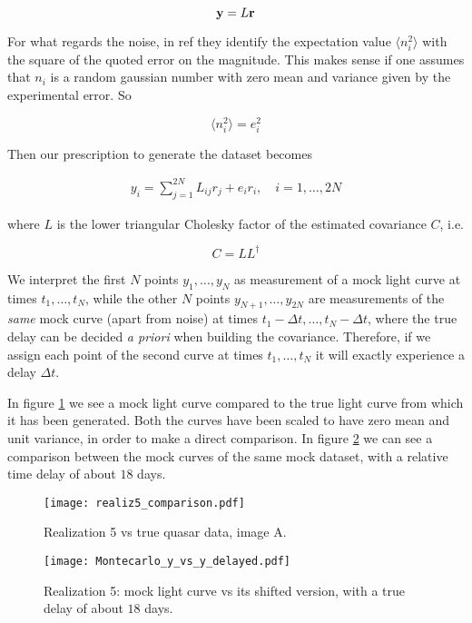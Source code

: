 \begin{equation}
\mathbf{y} = L \mathbf{r}
\end{equation}

For what regards the noise, in ref \cite{Press1992} they identify the expectation value $\langle n_i^2 \rangle$ with the square of the quoted error on the magnitude. This makes sense if one assumes that $n_i$ is a random gaussian number with zero mean and variance given by the experimental error. So

\begin{equation}
\langle n_i^2 \rangle = e_i^2
\end{equation}

Then our prescription to generate the dataset becomes

\begin{align}\label{eq:reform-artificial-prescr}
y_i = \sum_{j=1}^{2N} L_{ij} r_j + e_i r_i, \quad i = 1, \dots , 2N
\end{align}

where $L$ is the lower triangular Cholesky factor of the estimated covariance $C$, i.e.

\[
C = L L^{\dagger}
\]

We interpret the first $N$ points $y_1, \dots, y_N$ as measurement of a mock light curve at times $t_1, \dots , t_N$, 
while the other $N$ points $y_{N+1}, \dots, y_{2N}$ are measurements of the \emph{same} mock curve (apart from noise) at times 
$t_1-\Delta t, \dots , t_N-\Delta t$, where the true delay can be decided \emph{a priori} when building the covariance. Therefore, if we assign each point of the second curve at times $t_1, \dots , t_N$ it will exactly experience a delay $\Delta t$.

In figure \ref{fig:artif-dataset-5-vs-real} we see a mock light curve compared to the true light curve from which it has been generated. Both the curves have been scaled to have zero mean and unit variance, in order to make a direct comparison. In figure \ref{fig:artif-dataset-5-shift-comparison} we can see a comparison between the mock curves of the same mock dataset, with a relative time delay of about $18$ days.

\begin{figure}
\centering
\texttt{[image: realiz5\_comparison.pdf]}
\caption{Realization 5 vs true quasar data, image A.}
\label{fig:artif-dataset-5-vs-real}
\end{figure}

\begin{figure}
\centering
\texttt{[image: Montecarlo\_y\_vs\_y\_delayed.pdf]}
\caption{Realization 5: mock light curve vs its shifted version, with a true delay of about $18$ days.}
\label{fig:artif-dataset-5-shift-comparison}
\end{figure}

